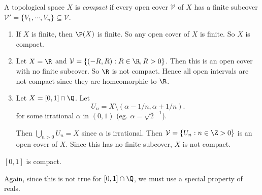 \documentclass[a4paper]{article}
\begin{document}
\begin{defi}
  A topological space $X$ is \emph{compact} if every open cover $\mathcal{V}$ of $X$ has a finite subcover $\mathcal{V}' = \{V_1, \cdots, V_n\} \subseteq \mathcal{V}$.
\end{defi}

\begin{eg}\leavevmode
  \begin{enumerate}
    \item If $X$ is finite, then $\P(X)$ is finite. So any open cover of $X$ is finite. So $X$ is compact.
    \item Let $X = \R$ and $\mathcal{V} = \{(-R, R) : R\in \R, R > 0\}$. Then this is an open cover with no finite subcover. So $\R$ is not compact. Hence all open intervals are not compact since they are homeomorphic to $\R$.
    \item Let $X = [0, 1]\cap \Q$. Let
      \[
        U_n = X\setminus(\alpha - 1/n, \alpha + 1/n).
      \]
      for some irrational $\alpha$ in $(0, 1)$ (eg. $\alpha = \sqrt{2}^{-1}$).

      Then $\bigcup_{n > 0} U_n = X$ since $\alpha$ is irrational.  Then $\mathcal{V} = \{U_n: n\in \Z > 0\}$ is an open cover of $X$. Since this has no finite subcover, $X$ is not compact.
  \end{enumerate}
\end{eg}

\begin{thm}
  $[0, 1]$ is compact.
\end{thm}
Again, since this is not true for $[0, 1]\cap \Q$, we must use a special property of reals.
\end{document}
